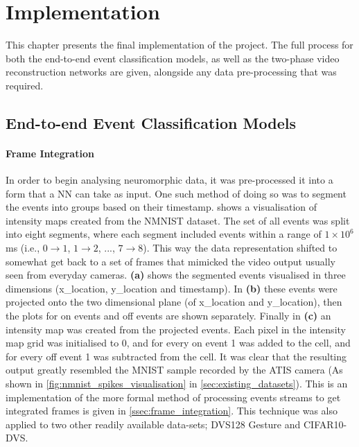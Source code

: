 \chapter{Implementation} \label{chap:implementation}

This chapter presents the final implementation of the project. The full process for both the end-to-end event classification models, as well as the two-phase video reconstruction networks are given, alongside any data pre-processing that was required.

\section{End-to-end Event Classification Models}

\subsubsection{Frame Integration}

In order to begin analysing neuromorphic data, it was pre-processed it into a form that a NN can take as input. One such method of doing so was to segment the events into groups based on their timestamp.  shows a visualisation of intensity maps created from the NMNIST\cite{NMNIST} dataset. The set of all events was split into eight segments, where each segment included events within a range of $ 1 \times 10^6 $ ms (i.e., $ 0 \rightarrow 1 $, $ 1 \rightarrow 2 $, ..., $ 7 \rightarrow 8 $). This way the data representation shifted to somewhat get back to a set of frames that mimicked the video output usually seen from everyday cameras. \textbf{(a)} shows the segmented events visualised in three dimensions (x\_location, y\_location and timestamp). In \textbf{(b)} these events were projected onto the two dimensional plane (of x\_location and y\_location), then the plots for on events and off events are shown separately. Finally in \textbf{(c)} an intensity map was created from the projected events. Each pixel in the intensity map grid was initialised to 0, and for every on event 1 was added to the cell, and for every off event 1 was subtracted from the cell. It was clear that the resulting output greatly resembled the MNIST\cite{MNIST} sample recorded by the ATIS camera (As shown in \cref{fig:nmnist_spikes_visualisation} in \cref{sec:existing_datasets}). This is an implementation of the more formal method of processing events streams to get integrated frames is given in \cref{ssec:frame_integration}. This technique was also applied to two other readily available data-sets; DVS128 Gesture and CIFAR10-DVS.

